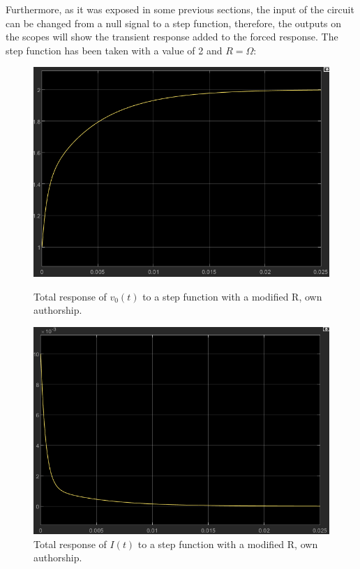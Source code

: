 \documentclass[a4paper,12pt]{article}
\begin{document}
\vspace{0.5cm}

Furthermore, as it was exposed in some previous sections, the input of the circuit can be changed from a null signal to a step function, therefore, the outputs on the scopes will show the transient response added to the forced response. The step function has been taken with a value of 2 and $R = \Omega$:

\vspace{0.5cm}

\begin{figure}[H]
    \centering
    \begin{minipage}[b]{0.45\linewidth}
        \centering
        \includegraphics[width=\linewidth]{scopevstep.png}
        \caption{Total response of $v_0(t)$ to a step function with a modified R, own authorship.}
        \label{fig:scopevstep}
    \end{minipage}
    \hspace{0.05\linewidth} %
    \begin{minipage}[b]{0.45\linewidth}
        \centering
        \includegraphics[width=\linewidth]{scopeistep.png}
        \caption{Total response of $I(t)$ to a step function with a modified R, own authorship.}
        \label{fig:scopeistep}
    \end{minipage}
\end{figure}
\end{document}
